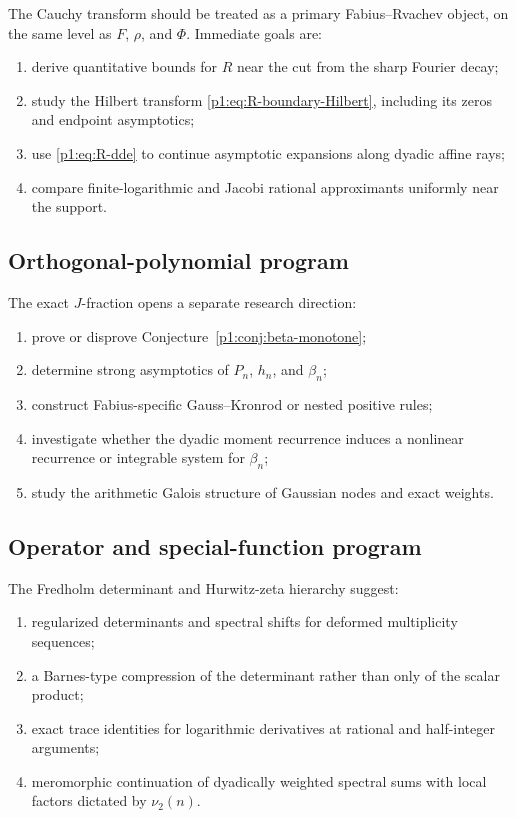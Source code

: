 \documentclass[11pt]{article}
\theoremstyle{definition}
\theoremstyle{remark}
\begin{document}
The Cauchy transform should be treated as a primary Fabius--Rvachev object, on the same
level as \(F\), \(\rho\), and \(\Phi\).  Immediate goals are:

\begin{enumerate}
\item derive quantitative bounds for \(R\) near the cut from the sharp Fourier decay;
\item study the Hilbert transform \eqref{p1:eq:R-boundary-Hilbert}, including its zeros and
      endpoint asymptotics;
\item use \eqref{p1:eq:R-dde} to continue asymptotic expansions along dyadic affine rays;
\item compare finite-logarithmic and Jacobi rational approximants uniformly near the
      support.
\end{enumerate}

\subsection{Orthogonal-polynomial program}

The exact \(J\)-fraction opens a separate research direction:

\begin{enumerate}
\item prove or disprove Conjecture~\ref{p1:conj:beta-monotone};
\item determine strong asymptotics of \(P_n\), \(h_n\), and \(\beta_n\);
\item construct Fabius-specific Gauss--Kronrod or nested positive rules;
\item investigate whether the dyadic moment recurrence induces a nonlinear recurrence or
      integrable system for \(\beta_n\);
\item study the arithmetic Galois structure of Gaussian nodes and exact weights.
\end{enumerate}

\subsection{Operator and special-function program}

The Fredholm determinant and Hurwitz-zeta hierarchy suggest:

\begin{enumerate}
\item regularized determinants and spectral shifts for deformed multiplicity sequences;
\item a Barnes-type compression of the determinant rather than only of the scalar product;
\item exact trace identities for logarithmic derivatives at rational and half-integer
      arguments;
\item meromorphic continuation of dyadically weighted spectral sums with local factors
      dictated by \(\nu_2(n)\).
\end{enumerate}
\end{document}
